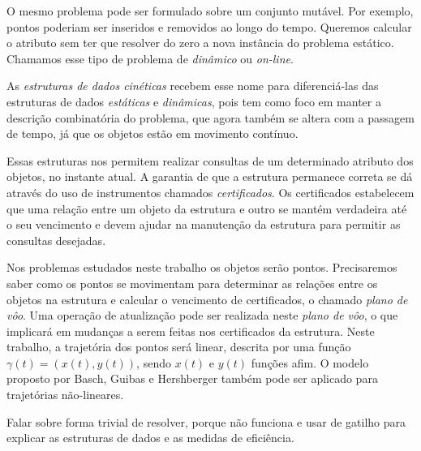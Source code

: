 O mesmo problema pode ser formulado sobre um conjunto mutável. Por exemplo,
pontos poderiam ser inseridos e removidos ao longo do tempo. Queremos calcular o
atributo sem ter que resolver do zero a nova instância do problema estático.
Chamamos esse tipo de problema de \textit{dinâmico} ou \textit{on-line}.

As \emph{estruturas de dados cinéticas} recebem esse nome para diferenciá-las
das estruturas de dados \textit{estáticas} e \textit{dinâmicas}, pois tem como
foco em manter a descrição combinatória do problema, que agora também se altera
com a passagem de tempo, já que os objetos estão em movimento contínuo.

Essas estruturas nos permitem realizar consultas de um determinado atributo dos
objetos, no instante atual. A garantia de que a estrutura permanece correta se
dá através do uso de instrumentos chamados \textit{certificados}. Os
certificados estabelecem que uma relação entre um objeto da estrutura e outro se
mantém verdadeira até o seu vencimento e devem ajudar na manutenção da estrutura
para permitir as consultas desejadas.

Nos problemas estudados neste trabalho os objetos serão pontos. Precisaremos
saber como os pontos se movimentam para determinar as relações entre os objetos
na estrutura e calcular o vencimento de certificados, o chamado \textit{plano de
vôo}. Uma operação de atualização pode ser realizada neste \emph{plano de vôo}, o que
implicará em mudanças a serem feitas nos certificados da estrutura. Neste
trabalho, a trajetória dos pontos será linear, descrita por uma função
$\gamma(t) = (x(t), y(t))$, sendo $x(t)$ e $y(t)$ funções afim. O modelo
proposto por Basch, Guibas e Hershberger também pode ser aplicado para
trajetórias não-lineares.

Falar sobre forma trivial de resolver, porque não funciona e usar de gatilho
para explicar as estruturas de dados e as medidas de eficiência.

